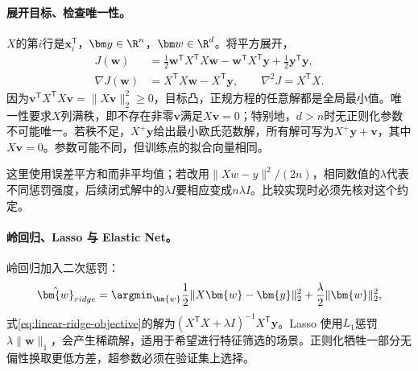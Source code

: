 \paragraph{展开目标、检查唯一性。}
$X$的第$i$行是$\bm x_i^{\mathsf T}$，$\bm y\in\R^n$，$\bm w\in\R^d$。将平方展开，
\begin{align}
 J(\bm w)&=\tfrac12\bm w^{\mathsf T}X^{\mathsf T}X\bm w
 -\bm w^{\mathsf T}X^{\mathsf T}\bm y+\tfrac12\bm y^{\mathsf T}\bm y,\\
 \nabla J(\bm w)&=X^{\mathsf T}X\bm w-X^{\mathsf T}\bm y,\qquad
 \nabla^2J=X^{\mathsf T}X.
\end{align}
因为$\bm v^{\mathsf T}X^{\mathsf T}X\bm v=\|X\bm v\|_2^2\geq0$，目标凸，正规方程的任意解都是全局最小值。唯一性要求$X$列满秩，即不存在非零$\bm v$满足$X\bm v=0$；特别地，$d>n$时无正则化参数不可能唯一。若秩不足，$X^+\bm y$给出最小欧氏范数解，所有解可写为$X^+\bm y+\bm v$，其中$X\bm v=0$。参数可能不同，但训练点的拟合向量相同。

这里使用误差平方和而非平均值；若改用$\|Xw-y\|^2/(2n)$，相同数值的$\lambda$代表不同惩罚强度，后续闭式解中的$\lambda I$要相应变成$n\lambda I$。比较实现时必须先核对这个约定。

\paragraph{岭回归、Lasso 与 Elastic Net。}
岭回归加入二次惩罚：
\begin{equation}
 \hat{\bm{w}}_{ridge}=\argmin_{\bm{w}}\frac12\|X\bm{w}-\bm{y}\|_2^2+\frac{\lambda}{2}\|\bm{w}\|_2^2,\label{eq:linear-ridge-objective}
\end{equation}
式\eqref{eq:linear-ridge-objective}的解为$(X^{\mathsf T}X+\lambda I)^{-1}X^{\mathsf T}\bm{y}$。Lasso 使用$L_1$惩罚$\lambda\|\bm{w}\|_1$，会产生稀疏解，适用于希望进行特征筛选的场景。正则化牺牲一部分无偏性换取更低方差，超参数必须在验证集上选择。

